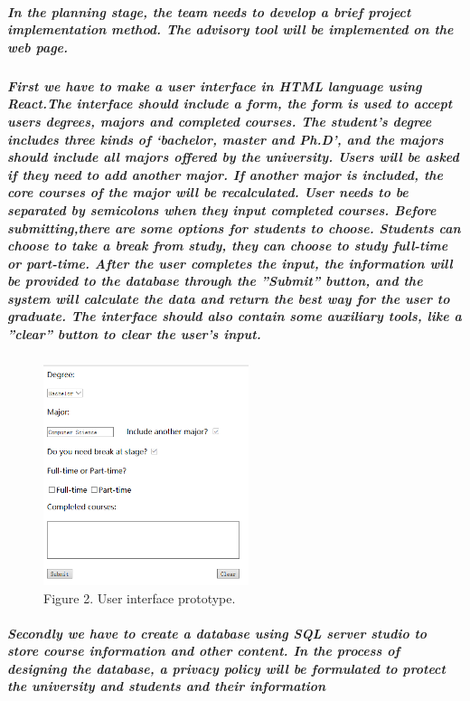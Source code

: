 \documentclass[12pt]{article}
\begin{document}
\subparagraph{In the planning stage, the team needs to develop a brief project implementation method. The advisory tool will be implemented on the web page.}


\subparagraph{First we have to make a user interface in HTML language using React.The interface  should  include  a  form,  the  form  is  used  to  accept  users degrees, majors and completed courses. The student's degree includes three kinds of ‘bachelor, master and Ph.D’, and the majors should include all majors offered by the university. Users will be asked if they need to add another major.  If another major is included, the core courses of the major will be recalculated. User needs to be separated by semicolons when they input completed courses.  Before submitting,there are some options for students to choose.  Students can choose to take a break from study, they can choose to study full-time or part-time.  After the user completes the input, the information will be provided to the database through the ”Submit” button, and the system will calculate the data and return the best way for the user to graduate.  The interface should also contain some auxiliary tools, like a ”clear” button to clear the user’s input.}

\begin{figure}[h]
\centering
\includegraphics[width=6cm]{./htmldemo.png}\\
Figure 2. User interface prototype.
\end{figure}

\subparagraph{Secondly we have to create a database using SQL server studio to store course information and other content. In the process of designing the database, a privacy policy will be formulated to protect the university and students and their information\\}
\end{document}
